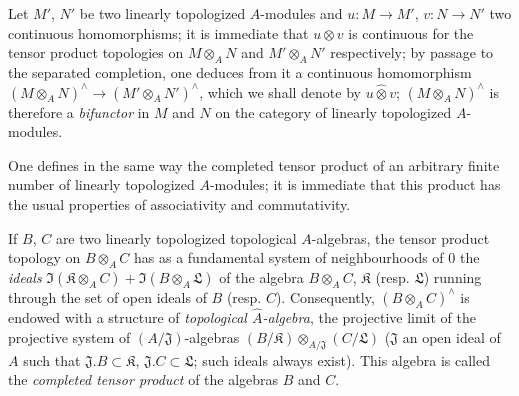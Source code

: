 \begin{env}[7.7.3]
\label{0.7.7.3}
Let $M'$, $N'$ be two linearly topologized $A$-modules and
$u:M\to M'$, $v:N\to N'$ two continuous homomorphisms; it is immediate
that $u\otimes v$ is continuous for the tensor product topologies on
$M\otimes_A N$ and $M'\otimes_A N'$ respectively; by passage to the separated
completion, one deduces from it a continuous homomorphism
$(M\otimes_A N)^\wedge\to(M'\otimes_A N')^\wedge$, which we shall denote
by $u\widehat\otimes v$; $(M\otimes_A N)^\wedge$ is therefore a
\emph{bifunctor} in $M$ and $N$ on the category of linearly topologized
$A$-modules.
\end{env}

\begin{env}[7.7.4]
\label{0.7.7.4}
One defines in the same way the completed tensor product of an arbitrary finite number
of linearly topologized $A$-modules; it is immediate that this product
has the usual properties of associativity and commutativity.
\end{env}

\begin{env}[7.7.5]
\label{0.7.7.5}
If $B$, $C$ are two linearly topologized topological $A$-algebras,
the tensor product topology on $B\otimes_A C$ has as a fundamental system
of neighbourhoods of $0$ the \emph{ideals}
$\Im(\mathfrak K\otimes_A C)+\Im(B\otimes_A\mathfrak L)$ of the algebra
$B\otimes_A C$, $\mathfrak K$ (resp. $\mathfrak L$) running through the set
of open ideals of $B$ (resp. $C$). Consequently, $(B\otimes_A C)^\wedge$
is endowed with a structure of \emph{topological $\widehat A$-algebra}, the projective
limit of the projective system of $(A/\mathfrak J)$-algebras
$(B/\mathfrak K)\otimes_{A/\mathfrak J}(C/\mathfrak L)$ ($\mathfrak J$
an open ideal of $A$ such that $\mathfrak J.B\subset\mathfrak K$,
$\mathfrak J.C\subset\mathfrak L$; such ideals always exist). This
algebra is called the \emph{completed tensor product} of the algebras $B$ and
$C$.
\end{env}

